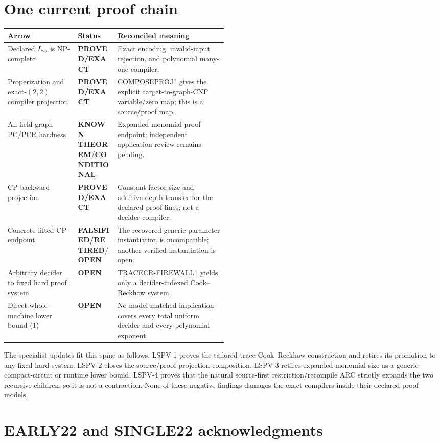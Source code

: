 \documentclass[11pt]{article}
\newcommand{\EXACT}{\textbf{PROVED/EXACT}}
\newcommand{\KNOWN}{\textbf{KNOWN THEOREM}}
\newcommand{\COND}{\textbf{CONDITIONAL}}
\newcommand{\OPEN}{\textbf{OPEN}}
\newcommand{\RET}{\textbf{FALSIFIED/RETIRED}}
\newcommand{\Ltwo}{L_{22}}
\begin{document}
\section{One current proof chain}
\begin{center}
\begin{tabularx}{0.98\linewidth}{@{}p{0.32\linewidth}p{0.18\linewidth}X@{}}
\toprule
Arrow & Status & Reconciled meaning\\
\midrule
Declared \(\Ltwo\) is NP-complete & \EXACT & Exact encoding, invalid-input rejection, and polynomial many-one compiler.\\
Properization and exact-\((2,2)\) compiler projection & \EXACT & COMPOSEPROJ1 gives the explicit target-to-graph-CNF variable/zero map; this is a source/proof map.\\
All-field graph PC/PCR hardness & \KNOWN/\COND & Expanded-monomial proof endpoint; independent application review remains pending.\\
CP backward projection & \EXACT & Constant-factor size and additive-depth transfer for the declared proof lines; not a decider compiler.\\
Concrete lifted CP endpoint & \RET/\OPEN & The recovered generic parameter instantiation is incompatible; another verified instantiation is open.\\
Arbitrary decider to fixed hard proof system & \OPEN & TRACECR-FIREWALL1 yields only a decider-indexed Cook--Reckhow system.\\
Direct whole-machine lower bound (1) & \OPEN & No model-matched implication covers every total uniform decider and every polynomial exponent.\\
\bottomrule
\end{tabularx}
\end{center}

The specialist updates fit this spine as follows.  LSPV-1 proves the tailored
trace Cook--Reckhow construction and retires its promotion to any fixed hard
system.  LSPV-2 closes the source/proof projection composition.  LSPV-3
retires expanded-monomial size as a generic compact-circuit or runtime lower
bound.  LSPV-4 proves that the natural source-first restriction/recompile ARC
strictly expands the two recursive children, so it is not a contraction.
None of these negative findings damages the exact compilers inside their
declared proof models.

\section{EARLY22 and SINGLE22 acknowledgments}
\end{document}
